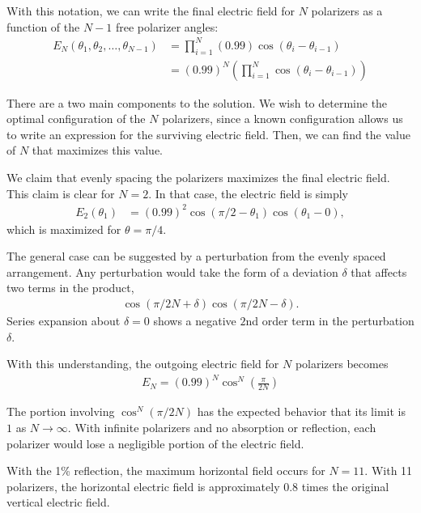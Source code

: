 \documentclass[reqno]{amsart}
\begin{document}
With this notation, we can write the final electric field for $N$ polarizers as a function of the $N-1$ free polarizer angles:
\begin{align*}
E_N(\theta_1, \theta_2, \ldots, \theta_{N-1}) &= \prod_{i=1}^{N} (0.99)\cos\left(\theta_i-\theta_{i-1}\right)\\
&= (0.99)^N \left(\prod_{i=1}^{N} \cos\left(\theta_i-\theta_{i-1}\right)\right)
\end{align*}

There are a two main components to the solution. We wish to determine the optimal configuration of the $N$ polarizers, since a known configuration allows us to write an expression for the surviving electric field. Then, we can find the value of $N$ that maximizes this value. 

We claim that evenly spacing the polarizers maximizes the final electric field. This claim is clear for $N=2$. In that case, the electric field is simply
\begin{align*}
E_2(\theta_1) &= (0.99)^2 \cos(\pi/2-\theta_1)\cos(\theta_1-0),
\end{align*}
which is maximized for $\theta=\pi/4$. 

The general case can be suggested by a perturbation from the evenly spaced arrangement. Any perturbation would take the form of a deviation $\delta$ that affects two terms in the product, 
\begin{align*}
\cos(\pi/2N + \delta)\cos(\pi/2N-\delta).
\end{align*}  
Series expansion about $\delta=0$ shows a negative $2$nd order term in the perturbation $\delta$.

With this understanding, the outgoing electric field for $N$ polarizers becomes 
\begin{align*}
E_N = (0.99)^N \cos^N\left(\frac{\pi}{2N}\right)
\end{align*}

The portion involving $\cos^N(\pi/2N)$ has the expected behavior that its limit is $1$ as $N\rightarrow \infty$. With infinite polarizers and no absorption or reflection, each polarizer would lose a negligible portion of the electric field. 

With the 1\% reflection, the maximum horizontal field occurs for $N=11$. With 11 polarizers, the horizontal electric field is approximately $0.8$ times the original vertical electric field. 
\end{document}

